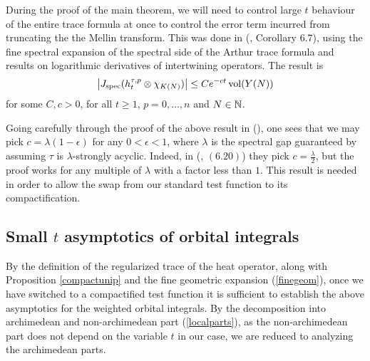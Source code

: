 During the proof of the main theorem, we will need to control large $t$ behaviour of the entire trace formula at once to control the error term incurred from truncating the the Mellin transform. This was done in (\cite{MzM2}, Corollary $6.7$), using the fine spectral expansion of the spectral side of the Arthur trace formula and results on logarithmic derivatives of intertwining operators. The result is
\begin{align}\label{larget}
    \left\vert J_{\text{spec}}(h_t^{\tau,p}\otimes \chi_{K(N)})\right\vert \leq Ce^{-c t}\operatorname{vol}(Y(N))
\end{align}
for some $C,c>0$, for all $t\geq 1$, $p=0,\dots,n$ and $N\in\mathbb{N}$.
\begin{rmk}
    Going carefully through the proof of the above result in (\cite{MzM2}), one sees that we may pick $c=\lambda(1-\epsilon)$ for any $0<\epsilon<1$, where $\lambda$ is the spectral gap guaranteed by assuming $\tau$ is $\lambda$-strongly acyclic. Indeed, in  (\cite{MzM2}, $(6.20)$) they pick $c=\frac{\lambda}{2}$, but the proof works for any multiple of $\lambda$ with a factor less than $1$.  This result is needed in order to allow the swap from our standard test function to its compactification.
\end{rmk} 

\subsection{Small $t$ asymptotics of orbital integrals}

By the definition of the regularized trace of the heat operator, along with Proposition \ref{compactunip} and the fine geometric expansion (\ref{finegeom}), once we have switched to a compactified test function it is sufficient to establish the above asymptotics for the weighted orbital integrals. By the decomposition into archimedean and non-archimedean part (\ref{localparts}), as the non-archimedean part does not depend on the variable $t$ in our case, we are reduced to analyzing the archimedean parts.

